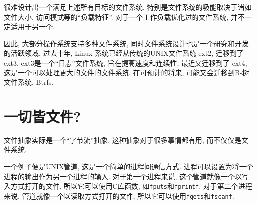 \documentclass[12pt]{book}
\begin{document}
{%
很难设计出一个满足上述所有目标的文件系统, 特别是文件系统的吸能取决于诸如文件大小, 
访问模式等的``负载特征''. 对于一个工作负载优化过的文件系统, 并不一定适用于另一个.

因此, 大部分操作系统支持多种文件系统, 同时文件系统设计也是一个研究和开发的活跃领域.
过去十年, Linux 系统已经从传统的UNIX文件系统 ext2, 迁移到了 ext3, 
ext3是一个``日志''文件系统, 旨在提高速度和连续性, 最近又迁移到了 ext4, 这是一个可以处理更大的文件的文件系统.
在可预计的将来, 可能又会迁移到B-树文件系统, Btrfs. 

\section{一切皆文件?}

文件抽象实际是一个``字节流''抽象,
这种抽象对于很多事情都有用, 而不仅仅是文件系统.

一个例子便是UNIX管道, 这是一个简单的进程间通信方式.
进程可以设置为将一个进程的输出作为另一个进程的输入. 对于第一个进程来说, 
这个管道就像一个以写入方式打开的文件, 所以它可以使用C库函数, 如{\tt fputs}和{\tt fprintf}.
对于第二个进程来说, 管道就像一个以读取方式打开的文件, 所以它可以使用{\tt fgets}和{\tt fscanf}.

}
\end{document}
